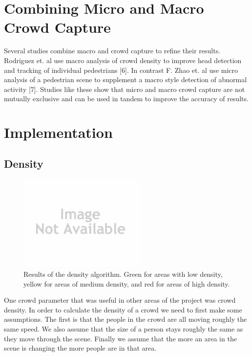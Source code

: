 \documentclass[conference]{IEEEtran}
\begin{document}
\section{Combining Micro and Macro Crowd Capture}

Several studies combine macro and crowd capture to refine their results. Rodriguez et. al use macro analysis of crowd density to improve head detection and tracking of individual pedestrians [6]. In contrast F. Zhao et. al use micro analysis of a pedestrian scene to supplement a macro style detection of abnormal activity [7]. Studies like these show that micro and macro crowd capture are not mutually exclusive and can be used in tandem to improve the accuracy of results. 

\section{Implementation}

\subsection{Density}

\begin{figure}[!t]
\centering
\includegraphics[width=2.5in]{noImage.jpg}
\caption{Results of the density algorithm. Green for areas with low density, yellow for areas of medium density, and red for areas of high density.}
\label{Density}
\end{figure}

One crowd parameter that was useful in other areas of the project was crowd density. In order to calculate the density of a crowd we need to first make some assumptions. The first is that the people in the crowd are all moving roughly the same speed. We also assume that the size of a person stays roughly the same as they move through the scene. Finally we assume that the more an area in the scene is changing the more people are in that area.
\end{document}
